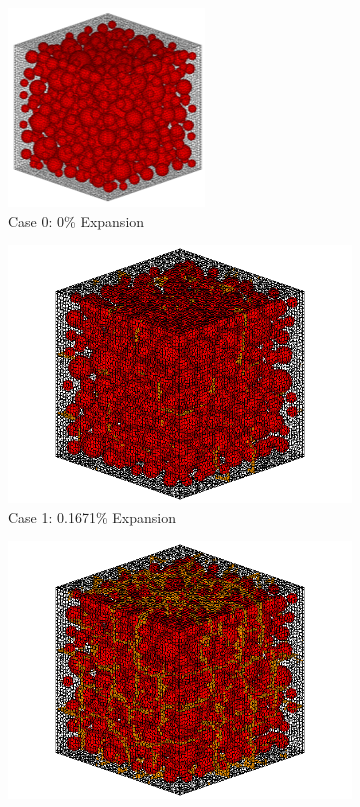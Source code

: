 \begin{figure}[!h]
\centering

    \begin{subfigure}{.5\textwidth}
      \centering
      \includegraphics[width=.6\linewidth]{Files/Aggregate/A30.png} %
    \caption{Case 0: 0\% Expansion}
    \end{subfigure}%
    \begin{subfigure}{.5\textwidth}
      \centering
      \includegraphics[width=.8\linewidth]{Files/exp_3D/DEF/A30X-5C_1_c.png}
    \caption{Case 1: 0.1671\% Expansion}
    \end{subfigure}
    \begin{subfigure}{.5\textwidth}
      \centering
      \includegraphics[width=.8\linewidth]{Files/exp_3D/DEF/A30X-5C_2_c.png}

\end{subfigure}
\end{figure}
